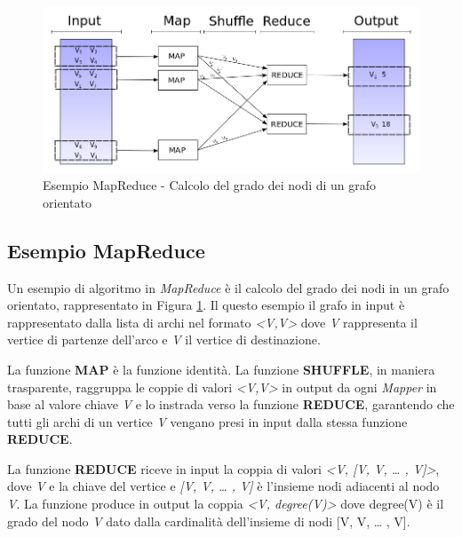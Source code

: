 \documentclass[LaM,binding=0.6cm]{sapthesis}
\begin{document}
\begin{figure}
\centering
\includegraphics[width=1\textwidth]{esempio_degree}
\caption{Esempio MapReduce - Calcolo del grado dei nodi di un grafo orientato}
\label{fig:SchemaMapReduce}
\end{figure}


\subsection{Esempio MapReduce}

Un esempio di algoritmo in \textit{MapReduce} è il calcolo del grado dei nodi in un grafo orientato, rappresentato in Figura \ref{fig:SchemaMapReduce}. Il questo esempio il grafo in input è rappresentato dalla lista di archi nel formato \textit{<V,V>} dove \textit{V} rappresenta il vertice di partenze dell'arco e \textit{V} il vertice di destinazione.

La funzione \textbf{MAP} è la funzione identità. La funzione \textbf{SHUFFLE}, in maniera trasparente, raggruppa le coppie di valori \textit{<V,V>} in output da ogni \textit{Mapper} in base al valore chiave \textit{V} e lo instrada verso la funzione \textbf{REDUCE}, garantendo che tutti gli archi di un vertice \textit{V} vengano presi in input dalla stessa funzione \textbf{REDUCE}.

La funzione \textbf{REDUCE} riceve in input la coppia di valori \textit{<V, [V, V, … , V]>}, dove \textit{V} e la chiave del vertice  e \textit{[V, V, … , V]} è l'insieme nodi adiacenti al nodo \textit{V}. La funzione produce in output la coppia \textit{<V, degree(V)>} dove degree(V) è il grado del nodo \textit{V} dato dalla cardinalità dell'insieme di nodi [V, V, … , V].
 
\begin{minipage}{\linewidth}

\end{minipage}
\end{document}
